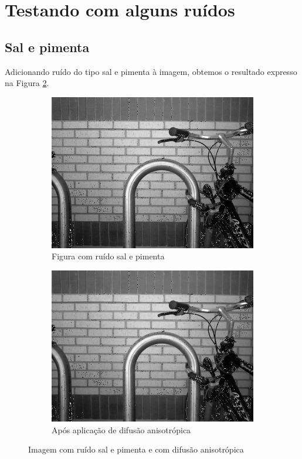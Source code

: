 \documentclass[10pt,a4paper]{article}
\begin{document}
\section{Testando com alguns ruídos}
\subsection{Sal e pimenta}
Adicionando ruído do tipo sal e pimenta à imagem, obtemos o resultado expresso na Figura \ref{fig:aniso_diff_sp}.
\begin{figure}[!ht]
    \centering
    \begin{subfigure}[ht]{0.4\textwidth}
        \includegraphics[width=\textwidth]{dst_sp.jpg}
        \caption{Figura com ruído sal e pimenta\cite{bike}}
        \label{fig:src_sp}
    \end{subfigure}
    \qquad
    \begin{subfigure}[ht]{0.4\textwidth}
        \includegraphics[width=\textwidth]{aniso_sp.jpg}
        \caption{\centering Após aplicação de difusão anisotrópica}
    \end{subfigure}
    \caption{Imagem com ruído sal e pimenta e com difusão anisotrópica}
    \label{fig:aniso_diff_sp}
\end{figure}
\end{document}
